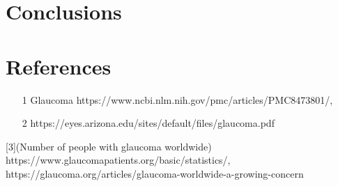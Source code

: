 \documentclass{article}
\begin{document}
\section{Conclusions}

\section{References}

\begin{itemize}
    \item [1] Glaucoma https://www.ncbi.nlm.nih.gov/pmc/articles/PMC8473801/, 
    \item [2]https://eyes.arizona.edu/sites/default/files/glaucoma.pdf

\end{itemize}
[3](Number of people with glaucoma worldwide) https://www.glaucomapatients.org/basic/statistics/, 
https://glaucoma.org/articles/glaucoma-worldwide-a-growing-concern
\end{document}

